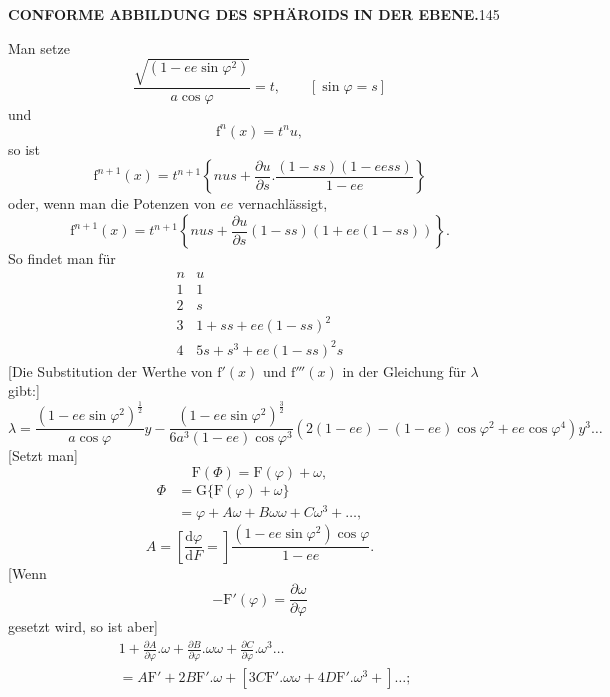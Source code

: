 \par\clearpage
\noindent\null\hfill{\small\textbf{CONFORME ABBILDUNG DES SPHÄROIDS IN DER EBENE.}}\hfill145\par\medskip
Man setze
\[\frac{\sqrt{(1-ee\sin\varphi^2)}}{a\cos\varphi}=t,\qquad[\sin\varphi=s]\]
\noindent und
\[\mathrm f^n(x)=t^nu,\]
\noindent so ist
\[\mathrm f^{n+1}(x)=t^{n+1}\left\{nus+\frac{\partial u}{\partial s}.\frac{(1-ss)(1-eess)}{1-ee}\right\}\]
\noindent oder, wenn man die Potenzen von \(ee\) vernachlässigt,
\[\mathrm f^{n+1}(x)=t^{n+1}\left\{nus+\frac{\partial u}{\partial s}(1-ss)(1+ee(1-ss))\right\}.\]
So findet man für
\[
\begin{array}{c|c}
n&u\\\hline
1&1\\2&s\\3&1+ss+ee(1-ss)^2\\4&5s+s^3+ee(1-ss)^2s
\end{array}
\]
[Die Substitution der Werthe von \(\mathrm f'(x)\) und \(\mathrm f'''(x)\) in der Gleichung für \(\lambda\) gibt:]
\[
\lambda=\frac{(1-ee\sin\varphi^2)^{\frac12}}{a\cos\varphi}y-\frac{(1-ee\sin\varphi^2)^{\frac32}}{6a^3(1-ee)\cos\varphi^3}(2(1-ee)-(1-ee)\cos\varphi^2+ee\cos\varphi^4)y^3\ldots
\]
[Setzt man]
\[\mathrm F(\Phi)=\mathrm F(\varphi)+\omega,\]
\[\begin{aligned}\Phi&=\mathrm G\{\mathrm F(\varphi)+\omega\}\\&=\varphi+A\omega+B\omega\omega+C\omega^3+\ldots,\end{aligned}\]
\noindent[wobei]
\[A=\left[\frac{\mathrm d\varphi}{\mathrm dF}=\right]\frac{(1-ee\sin\varphi^2)\cos\varphi}{1-ee}.\]
[Wenn
\[-\mathrm F'(\varphi)=\frac{\partial\omega}{\partial\varphi}\]
\noindent gesetzt wird, so ist aber]
\[
\begin{aligned}
&1+\frac{\partial A}{\partial\varphi}.\omega+\frac{\partial B}{\partial\varphi}.\omega\omega+\frac{\partial C}{\partial\varphi}.\omega^3\ldots\\
&=A\mathrm F'+2B\mathrm F'.\omega+[3C\mathrm F'.\omega\omega+4D\mathrm F'.\omega^3+]\ldots;
\end{aligned}
\]
\par

